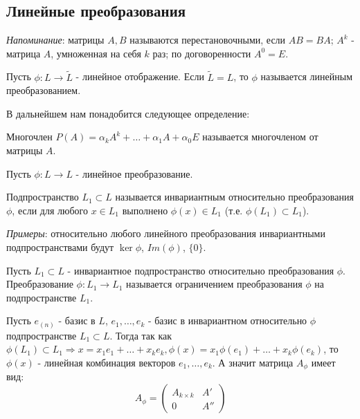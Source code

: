 \subsection{Линейные преобразования}

\textit{Напоминание}: матрицы $A, B$ называются перестановочными, если $AB=BA$; $A^k$ - матрица $A$, умноженная на себя $k$ раз; по договоренности $A^0=E$.
\begin{definition}
    Пусть $\phi: L \to \tilde{L}$ - линейное отображение. Если $\tilde{L} = L$, то $\phi$ называется линейным преобразованием.
\end{definition}

В дальнейшем нам понадобится следующее определение:
\begin{definition}
    Многочлен $P(A)=\alpha_k A^k+\dots+\alpha_1 A+\alpha_0 E$ называется многочленом от матрицы $A$.
\end{definition}
Пусть $\phi: L \to L$ - линейное преобразование.
\begin{definition}
    Подпространство $L_1 \subset L$ называется инвариантным относительно преобразования $\phi$, если для любого $x\in L_1$ выполнено $\phi(x)\in L_1$ (т.е. $\phi(L_1) \subset L_1$).
\end{definition}
\textit{Примеры}: относительно любого линейного преобразования инвариантными подпространствами будут $\ker \phi$, $Im(\phi)$, $\{0\}$.
\begin{definition}
    Пусть $L_1 \subset L$ - инвариантное подпространство относительно преобразования $\phi$. Преобразование $\phi: L_1 \to L_1$ называется ограничением преобразования $\phi$ на подпространстве $L_1$.
\end{definition}

Пусть $e_{(n)}$ - базис в $L$, $e_1, \dots, e_k$ - базис в инвариантном относительно $\phi$ подпространстве $L_1\subset L$. Тогда так как $\phi(L_1) \subset L_1 \Rightarrow x=x_1 e_1 +\dots +x_k e_k, \phi(x)=x_1\phi(e_1)+\dots+x_k\phi(e_k)$, то $\phi(x)$ - линейная комбинация векторов $e_1, \dots, e_k$. А значит матрица $A_{\phi}$ имеет вид:
\[
A_{\phi}=\left(
    \begin{array}{c|c}
    A_{k\times k} & A' \\
    \hline
    0 & A''
    \end{array}
\right)
\]
